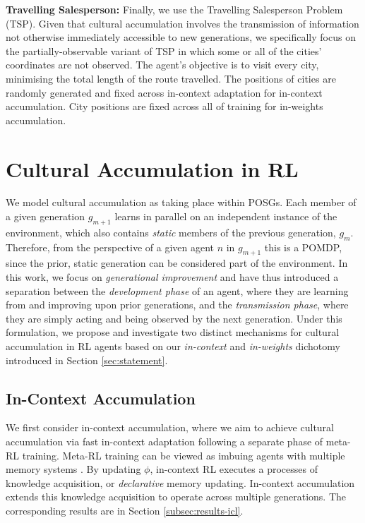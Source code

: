 \documentclass{article}
\begin{document}
\textbf{Travelling Salesperson:} Finally, we use the Travelling Salesperson Problem (TSP). Given that cultural accumulation involves the transmission of information not otherwise immediately accessible to new generations, we specifically focus on the partially-observable variant of TSP \citep{buck16, asl19} in which some or all of the cities' coordinates are not observed. The agent's objective is to visit every city, minimising the total length of the route travelled. The positions of cities are randomly generated and fixed across in-context adaptation for in-context accumulation. City positions are fixed across all of training for in-weights accumulation.
\section{Cultural Accumulation in RL}
We model cultural accumulation as taking place within POSGs. Each member of a given generation $g_{m+1}$ learns in parallel on an independent instance of the environment, which also contains \textit{static} members of the previous generation, $g_m$. Therefore, from the perspective of a given agent $n$ in $g_{m+1}$ this is a POMDP, since the prior, static generation can be considered part of the environment.
In this work, we focus on \textit{generational improvement} and have thus introduced a separation between the \textit{development phase} of an agent, where they are learning from and improving upon prior generations, and the \textit{transmission phase}, where they are simply acting and being observed by the next generation. Under this formulation, we propose and investigate two distinct mechanisms for cultural accumulation in RL agents based on our \textit{in-context} and \textit{in-weights} dichotomy introduced in Section \ref{sec:statement}.
\subsection{In-Context Accumulation}
We first consider in-context accumulation, where we aim to achieve cultural accumulation via fast in-context adaptation following a separate phase of meta-RL training. Meta-RL training can be viewed as imbuing agents with multiple memory systems \citep{squire1993structure}. By updating $\phi$, in-context RL executes a processes of knowledge acquisition, or \textit{declarative} memory \citep{squire2004memory} updating. In-context accumulation extends this knowledge acquisition to operate across multiple generations. The corresponding results are in Section \ref{subsec:results-icl}.
\end{document}

